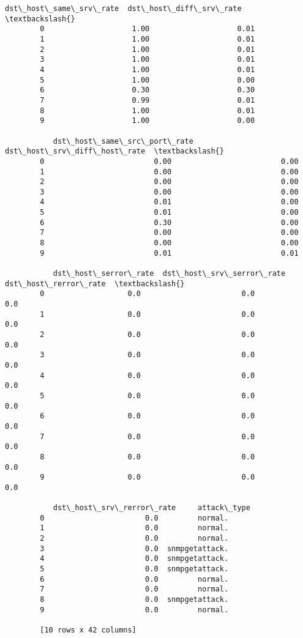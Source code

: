 \documentclass[11pt]{article}
\begin{document}
\begin{Verbatim}[commandchars=\\\{\}]
           dst\_host\_same\_srv\_rate  dst\_host\_diff\_srv\_rate  \textbackslash{}
        0                    1.00                    0.01   
        1                    1.00                    0.01   
        2                    1.00                    0.01   
        3                    1.00                    0.01   
        4                    1.00                    0.01   
        5                    1.00                    0.00   
        6                    0.30                    0.30   
        7                    0.99                    0.01   
        8                    1.00                    0.01   
        9                    1.00                    0.00   
        
           dst\_host\_same\_src\_port\_rate  dst\_host\_srv\_diff\_host\_rate  \textbackslash{}
        0                         0.00                         0.00   
        1                         0.00                         0.00   
        2                         0.00                         0.00   
        3                         0.00                         0.00   
        4                         0.01                         0.00   
        5                         0.01                         0.00   
        6                         0.30                         0.00   
        7                         0.00                         0.00   
        8                         0.00                         0.00   
        9                         0.01                         0.01   
        
           dst\_host\_serror\_rate  dst\_host\_srv\_serror\_rate  dst\_host\_rerror\_rate  \textbackslash{}
        0                   0.0                       0.0                   0.0   
        1                   0.0                       0.0                   0.0   
        2                   0.0                       0.0                   0.0   
        3                   0.0                       0.0                   0.0   
        4                   0.0                       0.0                   0.0   
        5                   0.0                       0.0                   0.0   
        6                   0.0                       0.0                   0.0   
        7                   0.0                       0.0                   0.0   
        8                   0.0                       0.0                   0.0   
        9                   0.0                       0.0                   0.0   
        
           dst\_host\_srv\_rerror\_rate     attack\_type  
        0                       0.0         normal.  
        1                       0.0         normal.  
        2                       0.0         normal.  
        3                       0.0  snmpgetattack.  
        4                       0.0  snmpgetattack.  
        5                       0.0  snmpgetattack.  
        6                       0.0         normal.  
        7                       0.0         normal.  
        8                       0.0  snmpgetattack.  
        9                       0.0         normal.  
        
        [10 rows x 42 columns]
\end{Verbatim}
\end{document}
